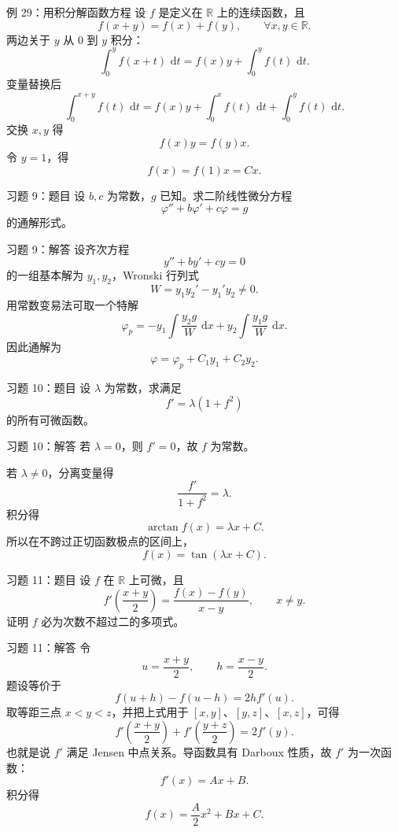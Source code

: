 \documentclass[aspectratio=169,10pt]{ctexbeamer}
\newcommand{\R}{\mathbb{R}}
\newcommand{\dd}{\,\mathrm{d}}
\begin{document}
\begin{frame}[t]{例 29：用积分解函数方程}
\small
设 $f$ 是定义在 $\R$ 上的连续函数，且
\[
  f(x+y)=f(x)+f(y),\qquad \forall x,y\in\R.
\]
两边关于 $y$ 从 $0$ 到 $y$ 积分：
\[
  \int_0^y f(x+t)\,\dd t=f(x)y+\int_0^y f(t)\,\dd t.
\]
变量替换后
\[
  \int_0^{x+y}f(t)\,\dd t
  =f(x)y+\int_0^x f(t)\,\dd t+\int_0^y f(t)\,\dd t.
\]
交换 $x,y$ 得
\[
  f(x)y=f(y)x.
\]
令 $y=1$，得
\[
  \boxed{f(x)=f(1)x=Cx.}
\]
\end{frame}

\begin{frame}[t]{习题 9：题目}
\small
设 $b,c$ 为常数，$g$ 已知。求二阶线性微分方程
\[
  \varphi''+b\varphi'+c\varphi=g
\]
的通解形式。
\end{frame}

\begin{frame}[t]{习题 9：解答}
\footnotesize
设齐次方程
\[
  y''+by'+cy=0
\]
的一组基本解为 $y_1,y_2$，Wronski 行列式
\[
  W=y_1y_2'-y_1'y_2\ne0.
\]
用常数变易法可取一个特解
\[
  \varphi_p
  =-y_1\int\frac{y_2g}{W}\,\dd x
  +y_2\int\frac{y_1g}{W}\,\dd x.
\]
因此通解为
\[
\boxed{\varphi=\varphi_p+C_1y_1+C_2y_2.}
\]
\end{frame}

\begin{frame}[t]{习题 10：题目}
\small
设 $\lambda$ 为常数，求满足
\[
  f'=\lambda(1+f^2)
\]
的所有可微函数。
\end{frame}

\begin{frame}[t]{习题 10：解答}
\small
若 $\lambda=0$，则 $f'=0$，故 $f$ 为常数。

若 $\lambda\ne0$，分离变量得
\[
  \frac{f'}{1+f^2}=\lambda.
\]
积分得
\[
  \arctan f(x)=\lambda x+C.
\]
所以在不跨过正切函数极点的区间上，
\[
\boxed{f(x)=\tan(\lambda x+C).}
\]
\end{frame}

\begin{frame}[t]{习题 11：题目}
\small
设 $f$ 在 $\R$ 上可微，且
\[
  f'\left(\frac{x+y}{2}\right)
  =\frac{f(x)-f(y)}{x-y},\qquad x\ne y.
\]
证明 $f$ 必为次数不超过二的多项式。
\end{frame}

\begin{frame}[t]{习题 11：解答}
\footnotesize
令
\[
  u=\frac{x+y}{2},\qquad h=\frac{x-y}{2}.
\]
题设等价于
\[
  f(u+h)-f(u-h)=2h f'(u).
\]
取等距三点 $x<y<z$，并把上式用于 $[x,y]$、$[y,z]$、$[x,z]$，可得
\[
  f'\left(\frac{x+y}{2}\right)
  +f'\left(\frac{y+z}{2}\right)=2f'(y).
\]
也就是说 $f'$ 满足 Jensen 中点关系。导函数具有 Darboux 性质，故 $f'$ 为一次函数：
\[
  f'(x)=Ax+B.
\]
积分得
\[
\boxed{f(x)=\frac A2x^2+Bx+C.}
\]
\end{frame}
\end{document}
